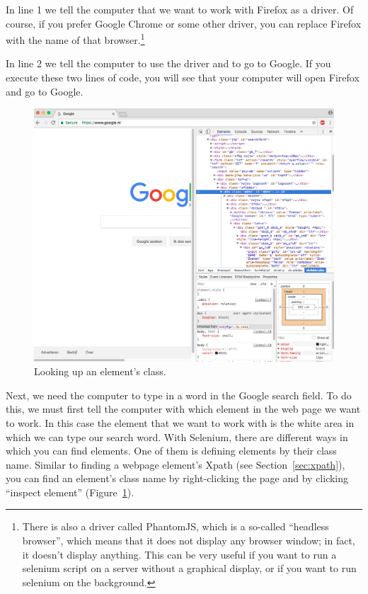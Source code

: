 \documentclass[a4paper,12pt]{book}
\begin{document}
\begin{appendices}
In line 1 we tell the computer that we want to work with Firefox as a driver. Of course, if you prefer Google Chrome or some other driver, you can replace Firefox with the name of that browser.\footnote{There is also a driver called PhantomJS, which is a so-called ``headless browser'', which means that it does not display any browser window; in fact, it doesn't display anything. This can be very useful if you want to run a selenium script on a server without a graphical display, or if you want to run selenium on the background.} 

In line 2 we tell the computer to use the driver and to go to Google. If you execute these two lines of code, you will see that your computer will open Firefox and go to Google.

\begin{figure}[h]
\centering
\includegraphics[width=\linewidth,keepaspectratio]{../pictures/selenium.png}
\caption{\label{fig:selenium}Looking up an element's class.}
\end{figure}

Next, we need the computer to type in a word in the Google search field. To do this, we must first tell the computer with which element in the web page we want to work. In this case the element that we want to work with is the white area in which we can type our search word. With Selenium, there are different ways in which you can find elements. One of them is defining elements by their class name. Similar to finding a webpage element’s Xpath (see Section~\ref{sec:xpath}), you can find an element’s class name by right-clicking the page and by clicking ``inspect element'' (Figure~\ref{fig:selenium}). 


\end{appendices}
\end{document}
